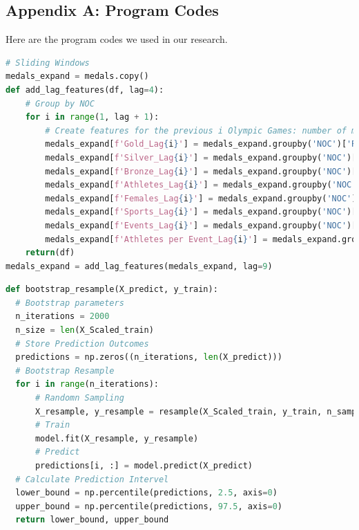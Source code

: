\documentclass[12pt]{article}  %
\begin{document}
\begin{subappendices}  %


\section{Appendix A: Program Codes}
Here are the program codes we used in our research.


\begin{lstlisting}[language=Python]
# Sliding Windows
medals_expand = medals.copy()
def add_lag_features(df, lag=4):
    # Group by NOC 
    for i in range(1, lag + 1):
        # Create features for the previous i Olympic Games: number of medals, totals, etc.
        medals_expand[f'Gold_Lag{i}'] = medals_expand.groupby('NOC')['Real_Gold'].shift(i)
        medals_expand[f'Silver_Lag{i}'] = medals_expand.groupby('NOC')['Real_Silver'].shift(i)
        medals_expand[f'Bronze_Lag{i}'] = medals_expand.groupby('NOC')['Real_Bronze'].shift(i)
        medals_expand[f'Athletes_Lag{i}'] = medals_expand.groupby('NOC')['Athletes'].shift(i)
        medals_expand[f'Females_Lag{i}'] = medals_expand.groupby('NOC')['Females'].shift(i)
        medals_expand[f'Sports_Lag{i}'] = medals_expand.groupby('NOC')['Sports'].shift(i)
        medals_expand[f'Events_Lag{i}'] = medals_expand.groupby('NOC')['Events'].shift(i)
        medals_expand[f'Athletes per Event_Lag{i}'] = medals_expand.groupby('NOC')['Athletes per Event'].shift(i)
    return(df)
medals_expand = add_lag_features(medals_expand, lag=9)
\end{lstlisting}
\begin{lstlisting}[language=Python]
def bootstrap_resample(X_predict, y_train):
  # Bootstrap parameters
  n_iterations = 2000
  n_size = len(X_Scaled_train)
  # Store Prediction Outcomes
  predictions = np.zeros((n_iterations, len(X_predict)))
  # Bootstrap Resample
  for i in range(n_iterations):
      # Randomn Sampling
      X_resample, y_resample = resample(X_Scaled_train, y_train, n_samples=n_size)
      # Train
      model.fit(X_resample, y_resample)
      # Predict
      predictions[i, :] = model.predict(X_predict)
  # Calculate Prediction Intervel
  lower_bound = np.percentile(predictions, 2.5, axis=0)
  upper_bound = np.percentile(predictions, 97.5, axis=0)
  return lower_bound, upper_bound
\end{lstlisting}

\end{subappendices}  %
\end{document}
